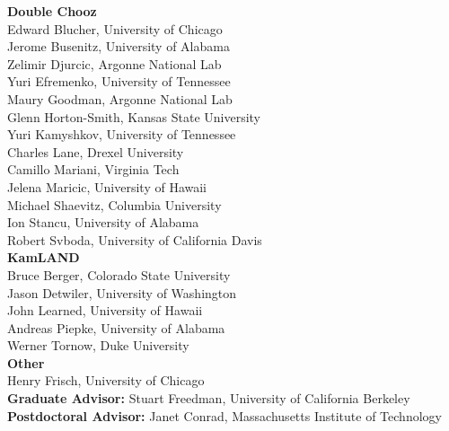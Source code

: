 \documentclass[11pt]{article}
\begin{document}
\textbf{Double Chooz}\\
Edward Blucher, University of Chicago \\
Jerome Busenitz, University of Alabama \\
Zelimir Djurcic, Argonne National Lab\\
Yuri Efremenko, University of Tennessee\\
Maury Goodman, Argonne National Lab\\
Glenn Horton-Smith, Kansas State University \\
Yuri Kamyshkov, University of Tennessee \\
Charles Lane, Drexel University\\
Camillo Mariani, Virginia Tech\\
Jelena Maricic, University of Hawaii\\
Michael Shaevitz, Columbia University\\
Ion Stancu, University of Alabama \\
Robert Svboda, University of California Davis \\

\textbf{KamLAND}\\
Bruce Berger, Colorado State University \\ 
Jason Detwiler, University of Washington \\
John Learned, University of Hawaii \\
Andreas Piepke, University of Alabama \\
Werner Tornow, Duke University \\

\textbf{Other}\\
Henry Frisch, University of Chicago \\

\noindent
\textbf{Graduate Advisor:} Stuart Freedman, University of California Berkeley \\
\textbf{Postdoctoral Advisor:} Janet Conrad, Massachusetts Institute of Technology\\
\end{document}
